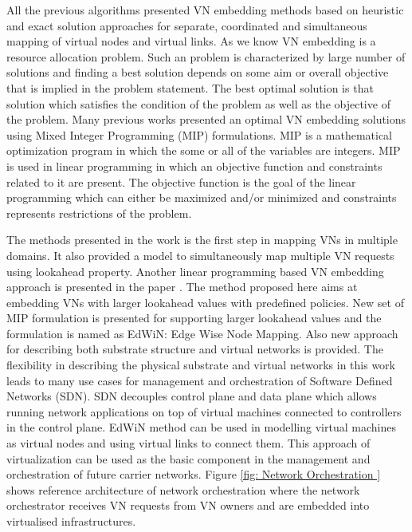 \documentclass[article,dr=phil,type=msc ,colorback,accentcolor=tud4b]{tudthesis}
\begin{document}
All the previous algorithms presented VN embedding methods based on heuristic and exact solution approaches for separate, coordinated and simultaneous mapping of virtual nodes and virtual links. As we know VN embedding is a resource allocation problem. Such an problem is characterized by large number of solutions and finding a best solution depends on some aim or overall objective that is implied in the problem statement. The best optimal solution is that solution which satisfies the condition of the problem as well as the objective of the problem. \newline
Many previous works presented an optimal VN embedding solutions using Mixed Integer Programming (MIP) formulations. MIP is a mathematical optimization program in which the some or all of the variables are integers. MIP is used in linear programming in which an objective function and constraints related to it are present. The objective function is the goal of the linear programming which can either be maximized and/or minimized and constraints represents restrictions of the problem.

The methods presented in the work \cite{vn_multiple} is the first step in mapping VNs in multiple domains. It also provided a model to simultaneously map multiple VN requests using lookahead property. Another linear programming based VN embedding approach is presented in the paper \cite{vneapproach}. The method proposed here aims at embedding VNs with larger lookahead values with predefined policies. New set of MIP formulation is presented for supporting larger lookahead values and the formulation is named as EdWiN: Edge Wise Node Mapping. Also new approach for describing both substrate structure and virtual networks is provided. The flexibility in describing the physical substrate and virtual networks in this work leads to many use cases for management and orchestration of Software Defined Networks (SDN). SDN decouples control plane and data plane which allows running network applications on top of virtual machines connected to controllers in the control plane. EdWiN method can be used in modelling virtual machines as virtual nodes and using virtual links to connect them. This approach of virtualization can be used as the basic component in the management and orchestration of future carrier networks. Figure \ref{fig: Network Orchestration } shows reference architecture of network orchestration where the network
orchestrator receives VN requests from VN owners and are embedded into virtualised infrastructures.\newline
\end{document}
